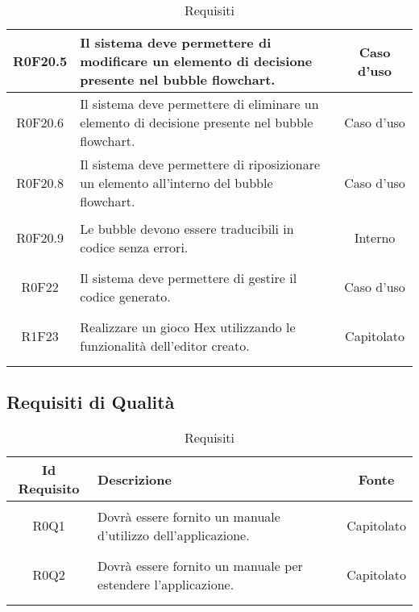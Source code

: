\documentclass[../AnalisiDeiRequisiti.tex]{subfiles}
\begin{document}
\begin{longtable}{|c|>{\centering}p{7cm}|c|}
\hypertarget{R0F20.5}{R0F20.5} & Il sistema deve permettere di modificare un elemento di decisione presente nel bubble flowchart. & Caso d'uso \\ \hline
\hypertarget{R0F20.6}{R0F20.6} & Il sistema deve permettere di eliminare un elemento di decisione presente nel bubble flowchart. & Caso d'uso \\ \hline
\hypertarget{R0F20.8}{R0F20.8} & Il sistema deve permettere di riposizionare un elemento all'interno del bubble flowchart. & Caso d'uso \\ \hline
\hypertarget{R0F20.9}{R0F20.9} & Le bubble devono essere traducibili in codice senza errori. & Interno \\ \hline
\hypertarget{R0F22}{R0F22} & Il sistema deve permettere di gestire il codice generato. & Caso d'uso \\ \hline
\hypertarget{R1F23}{R1F23} & Realizzare un gioco Hex utilizzando le funzionalità dell'editor creato. & Capitolato \\ \hline

\caption[Requisiti]{Requisiti}
\label{tabella:req0}
\end{longtable}
\clearpage
\subsection{Requisiti di Qualità}
\normalsize
\begin{longtable}{|c|>{\centering}p{7cm}|c|}
	\hline
	\textbf{Id Requisito} & \textbf{Descrizione} & \textbf{Fonte}\\
	\hline
	\endhead
	\hypertarget{R0Q1}{R0Q1} & Dovrà essere fornito un manuale d'utilizzo dell'applicazione. & Capitolato \\ \hline
	\hypertarget{R0Q2}{R0Q2} & Dovrà essere fornito un manuale per estendere l'applicazione. & Capitolato \\ \hline
	\caption[Requisiti]{Requisiti}
	\label{tabella:req1}
\end{longtable}
\clearpage
\end{document}

